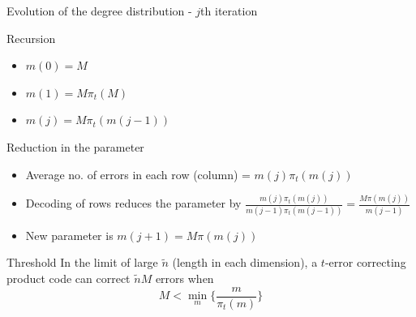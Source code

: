 \begin{frame}{Evolution of the degree distribution - $j$th iteration}


\begin{block}{Recursion}
\begin{itemize}
\item $m(0) = M$
\item $m(1) = M \pi_t(M)$
\item $m(j) = M \pi_t(m(j-1))$
\end{itemize}
\end{block}

\begin{block}{Reduction in the parameter}
\begin{itemize}
  \item Average no. of errors in each row (column) = $m(j) \pi_t(m(j))$
  \item Decoding of rows reduces the parameter by $\frac{m(j) \pi_t(m(j))}{m(j-1) \pi_t(m(j-1))} = \frac{M \pi(m(j))}{m(j-1)}$
  \item New parameter is $m(j+1) = M \pi(m(j))$
\end{itemize}
\end{block}

\begin{block}{Threshold}
In the limit of large $\tilde{n}$ (length in each dimension), a $t$-error correcting product code can correct $\tilde{n}M$ errors when
\[
M < \min_m \displaystyle{\{ \frac{m}{\pi_t(m)} \}}
\]
\end{block}

\end{frame}
%
